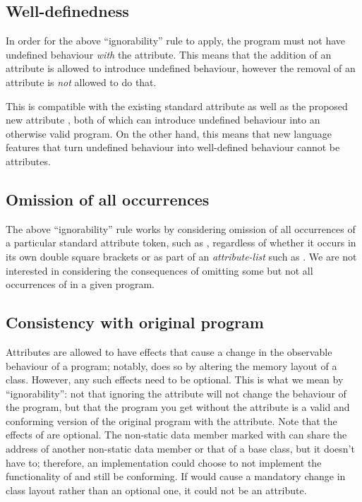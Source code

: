 \subsection{Well-definedness}

In order for the above ``ignorability'' rule to apply, the program must not have undefined behaviour \emph{with} the attribute. This means that the addition of an attribute is allowed to introduce undefined behaviour, however the removal of an attribute is \emph{not} allowed to do that.

This is compatible with the existing standard attribute \tcode{[[noreturn]]} as well as the proposed new attribute   \cite{P1774R6}, both of which can introduce undefined behaviour into an otherwise valid program. On the other hand, this means that new language features that turn undefined behaviour into well-defined behaviour cannot be attributes.

\subsection{Omission of all occurrences}

The above ``ignorability'' rule works by considering omission of all occurrences of a particular standard attribute token, such as , regardless of whether it occurs in its own double square brackets or as part of an \emph{attribute-list} such as . We are not interested in considering the consequences of omitting some but not all occurrences of  in a given program.

\subsection{Consistency with original program}

Attributes are allowed to have effects that cause a change in the observable behaviour of a program; notably,  does so by altering the memory layout of a class. However, any such effects need to be optional. This is what we mean by ``ignorability'': not that ignoring the attribute will not change the behaviour of the program, but that the program you get without the attribute is a valid and conforming version of the original program with the attribute. Note that the effects of  are optional. The non-static data member marked with  can share the address of another non-static data member or that of a base class, but it doesn't have to; therefore, an implementation could choose to not implement the functionality of  and still be conforming. If  would cause a mandatory change in class layout rather than an optional one, it could not be an attribute.

